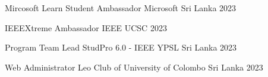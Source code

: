 

\begin{cvhonors}

  \cvhonor
  {Mircosoft Learn Student Ambassador} %
  {Microsoft} %
  {Sri Lanka} %
  {2023} %

  \cvhonor
  {IEEEXtreme Ambassador} %
  {IEEE} %
  {UCSC}
  {2023} %

  \cvhonor
  {Program Team Lead} %
  {StudPro 6.0 - IEEE YPSL} %
  {Sri Lanka}
  {2023} %

  \cvhonor
  {Web Administrator} %
  {Leo Club of University of Colombo} %
  {Sri Lanka}
  {2023} %


\end{cvhonors}
